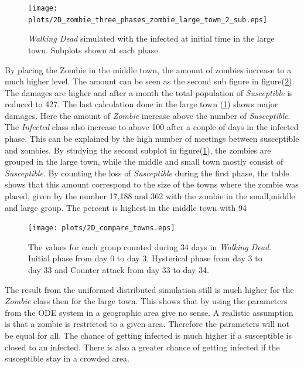 \documentclass[%
twoside,                 %
final,                   %
10pt]{article}
\begin{document}
\begin{figure}[ht]
  \centerline{\texttt{[image: plots/2D\_zombie\_three\_phases\_zombie\_large\_town\_2\_sub.eps]}}
  \caption{
  \label{fig:large_town} \emph{Walking Dead} simulated with the infected at initial time in the large town. Subplots shown at each phase.
  }
\end{figure}


By placing the Zombie in the middle town, the amount of zombies increase to a much higher level. The amount can be seen as the second sub figure in figure(\ref{fig:compare_towns}). The damages are higher and after a month the total population of \emph{Susceptible} is reduced to 427. The last calculation done in the large town (\ref{fig:large_town}) shows major damages. Here the amount of \emph{Zombie} increase above the number of \emph{Susceptible}. The \emph{Infected} class also increase to above 100 after a couple of days in the infected phase. This can be explained by the high number of meetings between susceptible and zombies. By studying the second subplot in figure(\ref{fig:large_town}), the zombies are grouped in the large town, while the middle and small town mostly consist of \emph{Susceptible}. By counting the loss of \emph{Susceptible} during the first phase, the table shows that this amount correspond to the size of the towns where the zombie was placed, given by the number 17,188 and 362 with the zombie in the small,middle and large group. The percent is highest in the middle town with 94 %


\begin{figure}[ht]
  \centerline{\texttt{[image: plots/2D\_compare\_towns.eps]}}
  \caption{
  \label{fig:compare_towns} The values for each group counted during 34 days in \emph{Walking Dead}. Initial phase from day 0 to day 3, Hysterical phase from day 3 to day 33 and Counter attack from day 33 to day 34.
  }
\end{figure}


The result from the uniformed distributed simulation still is much higher for the \emph{Zombie} class then for the large town. This shows that by using the parameters from the ODE system in a geographic area give no sense. A realistic assumption is that a zombie is restricted to a given area. Therefore the parameters will not be equal for all. The chance of getting infected is much higher if a susceptible is closed to an infected. There is also a greater chance of getting infected if the susceptible stay in a crowded area.
\end{document}
